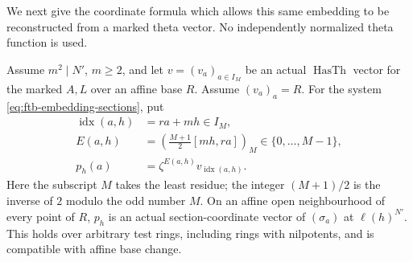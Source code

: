 We next give the coordinate formula which allows this
same embedding to be reconstructed from a marked theta
vector.  No independently normalized theta function
is used.

\begin{proposition}
\label{prop:ftb-actual-torsion-theta-coordinates}
Assume \(m^2\mid N'\), \(m\ge2\), and let \(v=(v_a)_{a\in I_M}\)
be an actual \(\operatorname{HasTh}\) vector for the
marked \(A,L\) over an affine base \(R\).
Assume \((v_a)_a=R\).
For the system \eqref{eq:ftb-embedding-sections}, put
\[
 \begin{split}
 \operatorname{idx}(a,h)&=ra+mh\in I_M,\\
 E(a,h)&=\left(\frac{M+1}{2}[mh,ra]\right)_{\!M}
                                                    \in\{0,\ldots,M-1\},\\
                         p_h(a)&=\zeta^{E(a,h)}v_{\operatorname{idx}(a,h)} .
 \end{split}
 \tag{TE7}\label{eq:ftb-actual-torsion-coordinate-formula}
\]
Here the subscript \(M\) takes the least residue; the
integer \((M+1)/2\) is the inverse of \(2\) modulo the
odd number \(M\).
On an affine open neighbourhood of every point of
\(R\), \(p_h\) is an actual section-coordinate vector
of \((\sigma_a)\) at \(\ell(h)^{N'}\).
This holds over arbitrary test rings, including rings
with nilpotents, and is compatible with affine
base change.
\end{proposition}
